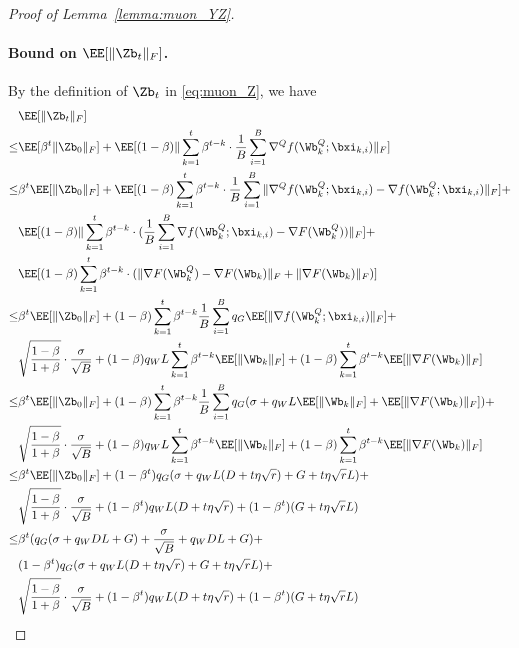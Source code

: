 \documentclass[11pt, letterpaper]{article}
\begin{document}
\begin{proof}[Proof of Lemma~\ref{lemma:muon_YZ}]
\paragraph{Bound on $\EE[\|\Zb_t\|_F]$.}
By the definition of $\Zb_t$ in \eqref{eq:muon_Z}, we have
\begin{align*}
    & \EE[\|\Zb_t\|_F] \\
    \le& \EE[\beta^t\|\Zb_0\|_F] + \EE[(1-\beta)\|\sum_{k=1}^t\beta^{t-k}\cdot\frac{1}{B}\sum_{i=1}^B   \nabla^Q f(\Wb_k^Q;\bxi_{k,i}) \|_F] \\
    \le& \beta^t\EE[\|\Zb_0\|_F] + \EE[(1-\beta)\sum_{k=1}^t\beta^{t-k}\cdot\frac{1}{B}\sum_{i=1}^B \|\nabla^Q f(\Wb_k^Q;\bxi_{k,i}) - \nabla f(\Wb_k^Q;\bxi_{k,i})\|_F] + \\
    & \EE[(1-\beta)\|\sum_{k=1}^t\beta^{t-k}\cdot(\frac{1}{B}\sum_{i=1}^B \nabla f(\Wb_k^Q;\bxi_{k,i}) - \nabla F(\Wb_k^Q)) \|_F] + \\
    & \EE[(1-\beta)\sum_{k=1}^t\beta^{t-k}\cdot(\|\nabla F(\Wb_k^Q) - \nabla F(\Wb_k)\|_F + \|\nabla F(\Wb_k)\|_F)] \\
    \le& \beta^t\EE[\|\Zb_0\|_F] + (1-\beta)\sum_{k=1}^t\beta^{t-k}\frac{1}{B}\sum_{i=1}^B q_G\EE[\|\nabla f(\Wb_k^Q;\bxi_{k,i})\|_F] + \\
    & \sqrt{\frac{1-\beta}{1+\beta}}\cdot\frac{\sigma}{\sqrt{B}} + (1-\beta)q_W L\sum_{k=1}^t\beta^{t-k}\EE[\|\Wb_k\|_F] + (1-\beta)\sum_{k=1}^t\beta^{t-k}\EE[\|\nabla F(\Wb_k)\|_F] \\
    \le& \beta^t\EE[\|\Zb_0\|_F] + (1-\beta)\sum_{k=1}^t\beta^{t-k}\frac{1}{B}\sum_{i=1}^B q_G(\sigma + q_W L\EE[\|\Wb_k\|_F] + \EE[\|\nabla F(\Wb_k)\|_F]) + \\
    & \sqrt{\frac{1-\beta}{1+\beta}}\cdot\frac{\sigma}{\sqrt{B}} + (1-\beta)q_W L\sum_{k=1}^t\beta^{t-k}\EE[\|\Wb_k\|_F] + (1-\beta)\sum_{k=1}^t\beta^{t-k}\EE[\|\nabla F(\Wb_k)\|_F] \\
    \le& \beta^t\EE[\|\Zb_0\|_F] + (1-\beta^t)q_G(\sigma + q_W L(D + t\eta\sqrt{r}) + G + t\eta\sqrt{r}L) + \\
    & \sqrt{\frac{1-\beta}{1+\beta}}\cdot\frac{\sigma}{\sqrt{B}} + (1-\beta^t)q_W L(D+ t\eta\sqrt{r}) + (1-\beta^t)(G + t\eta\sqrt{r}L) \\
    \le& \beta^t(q_G(\sigma + q_W D L + G) + \frac{\sigma}{\sqrt{B}} + q_W D L + G) + \\
    & (1-\beta^t)q_G(\sigma + q_W L(D + t\eta\sqrt{r}) + G + t\eta\sqrt{r}L) + \\
    & \sqrt{\frac{1-\beta}{1+\beta}}\cdot\frac{\sigma}{\sqrt{B}} + (1-\beta^t)q_W L(D+ t\eta\sqrt{r}) + (1-\beta^t)(G + t\eta\sqrt{r}L) \\

\end{align*}
\end{proof}
\end{document}
